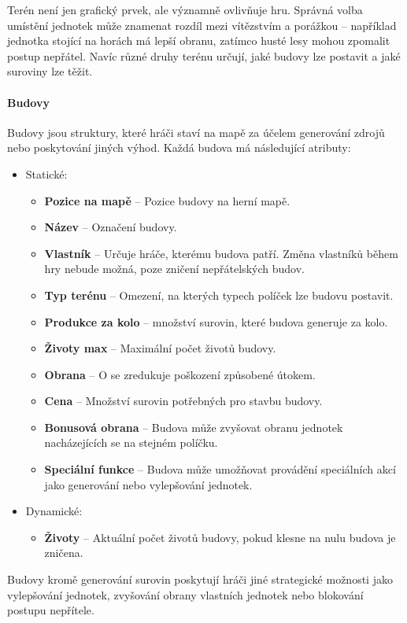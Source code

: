 Terén není jen grafický prvek, ale významně ovlivňuje hru. Správná volba umístění jednotek může znamenat rozdíl mezi vítězstvím a porážkou – například jednotka stojící na horách má lepší obranu, zatímco husté lesy mohou zpomalit postup nepřátel. Navíc různé druhy terénu určují, jaké budovy lze postavit a jaké suroviny lze těžit.



\paragraph{Budovy}
Budovy jsou struktury, které hráči staví na mapě za účelem generování zdrojů nebo poskytování jiných výhod. Každá budova má následující atributy:
\begin{itemize}
    \item Statické:
    \begin{itemize}
        \item \textbf{Pozice na mapě} -- Pozice budovy na herní mapě.
        \item \textbf{Název} -- Označení budovy.
        \item \textbf{Vlastník} -- Určuje hráče, kterému budova patří. Změna vlastníků během hry nebude možná, poze zničení nepřátelských budov.
        \item \textbf{Typ terénu} -- Omezení, na kterých typech políček lze budovu postavit.
        \item \textbf{Produkce za kolo} – množství surovin, které budova generuje za kolo.
        \item \textbf{Životy max} -- Maximální počet životů budovy.
        \item \textbf{Obrana} -- O se zredukuje poškození způsobené útokem.
        \item \textbf{Cena} -- Množství surovin potřebných pro stavbu budovy.
        \item \textbf{Bonusová obrana} -- Budova může zvyšovat obranu jednotek nacházejících se na stejném políčku.
        \item \textbf{Speciální funkce} -- Budova může umožňovat provádění speciálních akcí jako generování nebo vylepšování jednotek.
    \end{itemize}
    \item Dynamické:
    \begin{itemize}
        \item \textbf{Životy} -- Aktuální počet životů budovy, pokud klesne na nulu budova je zničena.
    \end{itemize}
\end{itemize}
Budovy kromě generování surovin poskytují hráči jiné strategické možnosti jako vylepšování jednotek, zvyšování obrany vlastních jednotek nebo blokování postupu nepřítele.

